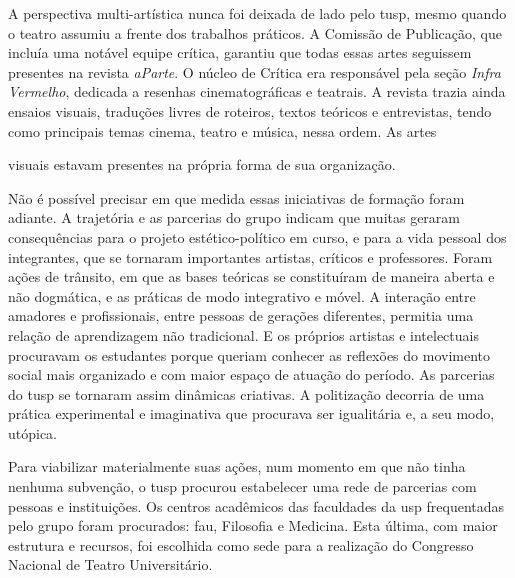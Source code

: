 A perspectiva multi-artística nunca foi deixada de lado pelo {\sc tusp}, mesmo
quando o teatro assumiu a frente dos trabalhos práticos. A Comissão de
Publicação, que incluía uma notável equipe crítica, garantiu que todas
essas artes seguissem presentes na revista {\it aParte}. O núcleo de
Crítica era responsável pela seção {\it Infra Vermelho}, dedicada a
resenhas cinematográficas e teatrais. A revista trazia ainda ensaios
visuais, traduções livres de roteiros, textos teóricos e entrevistas,
tendo como principais temas cinema, teatro e música, nessa ordem. As
artes

\column

\noindent{}visuais estavam presentes na própria forma de sua organização.

Não é possível precisar em que medida essas iniciativas de formação
foram adiante. A trajetória e as parcerias do grupo indicam que muitas
geraram consequências para o projeto estético-político em curso, e para
a vida pessoal dos integrantes, que se tornaram importantes artistas,
críticos e professores. Foram ações de trânsito, em que as bases
teóricas se constituíram de maneira aberta e não dogmática, e as
práticas de modo integrativo e móvel. A interação entre amadores e
profissionais, entre pessoas de gerações diferentes, permitia uma
relação de aprendizagem não tradicional. E os próprios artistas e
intelectuais procuravam os estudantes porque queriam conhecer as
reflexões do movimento social mais organizado e com maior espaço de
atuação do período. As parcerias do {\sc tusp} se tornaram assim dinâmicas
criativas. A politização decorria de uma prática experimental e
imaginativa que procurava ser igualitária e, a seu modo, utópica.

\page

{}{}
{}{}
{}{}
\stopcombination

\page

\subject{Base de ensaios e parcerias institucionais}

Para viabilizar materialmente suas ações, num momento em que não tinha
nenhuma subvenção, o {\sc tusp} procurou estabelecer uma rede de parcerias com
pessoas e instituições. Os centros acadêmicos das faculdades da {\sc usp}
frequentadas pelo grupo foram procurados: {\sc fau}, Filosofia e Medicina.
Esta última, com maior estrutura e recursos, foi escolhida como sede
para a realização do Congresso Nacional de Teatro Universitário.

